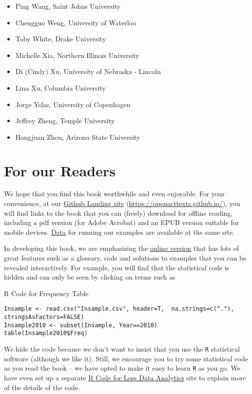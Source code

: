 \documentclass[]{book}
\theoremstyle{definition}
\theoremstyle{definition}
\theoremstyle{definition}
\theoremstyle{remark}
\begin{document}
\begin{itemize}
\item
  Ping Wang, Saint Johns University
\item
  Chengguo Weng, University of Waterloo
\item
  Toby White, Drake University
\item
  Michelle Xia, Northern Illinois University
\item
  Di (Cindy) Xu, University of Nebraska - Lincoln
\item
  Lina Xu, Columbia University
\item
  Jorge Yslas, University of Copenhagen
\item
  Jeffrey Zheng, Temple University
\item
  Hongjuan Zhou, Arizona State University
\end{itemize}

\section*{For our Readers}\label{for-our-readers}

We hope that you find this book worthwhile and even enjoyable. For your
convenience, at our \href{https://openacttexts.github.io/}{Github
Landing site} (\url{https://openacttexts.github.io/}), you will find
links to the book that you can (freely) download for offline reading,
including a pdf version (for Adobe Acrobat) and an EPUB version suitable
for mobile devices.
\href{https://github.com/OpenActTexts/Loss-Data-Analytics/tree/master/Data}{Data}
for running our examples are available at the same site.

In developing this book, we are emphasizing the
\href{https://openacttexts.github.io/Loss-Data-Analytics/index.html}{online
version} that has lots of great features such as a glossary, code and
solutions to examples that you can be revealed interactively. For
example, you will find that the statistical code is hidden and can only
be seen by clicking on terms such as

R Code for Frequency Table

\hypertarget{display.T:Frequency.2Intro}{}
\begin{verbatim}
Insample <- read.csv("Insample.csv", header=T,  na.strings=c("."), stringsAsFactors=FALSE)
Insample2010 <- subset(Insample, Year==2010)
table(Insample2010$Freq)
\end{verbatim}

We hide the code because we don't want to insist that you use the
\texttt{R} statistical software (although we like it). Still, we
encourage you to try some statistical code as you read the book -- we
have opted to make it easy to learn \texttt{R} as you go. We have even
set up a separate \href{https://openacttexts.github.io/LDARcode}{R Code
for Loss Data Analytics} site to explain more of the details of the
code.
\end{document}
